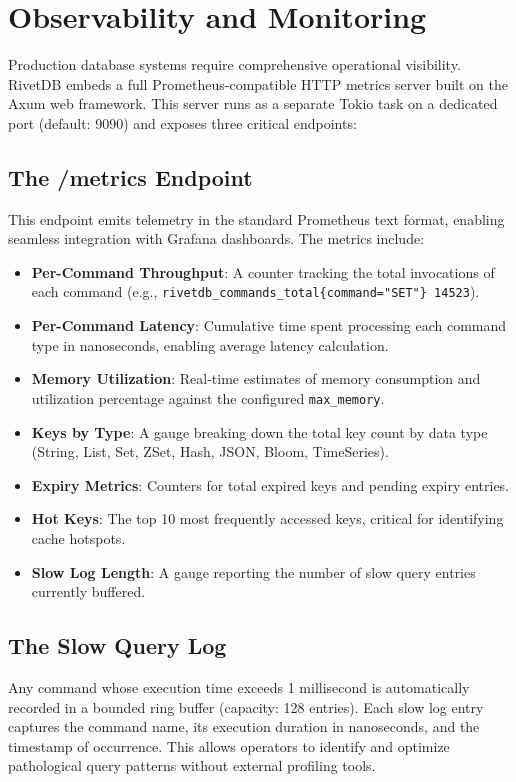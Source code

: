 \section{Observability and Monitoring}

Production database systems require comprehensive operational visibility. RivetDB embeds a full Prometheus-compatible HTTP metrics server built on the Axum web framework. This server runs as a separate Tokio task on a dedicated port (default: 9090) and exposes three critical endpoints:

\subsection{The /metrics Endpoint}
This endpoint emits telemetry in the standard Prometheus text format, enabling seamless integration with Grafana dashboards. The metrics include:

\begin{itemize}[leftmargin=2.5em]
    \item \textbf{Per-Command Throughput}: A counter tracking the total invocations of each command (e.g., \texttt{rivetdb\_commands\_total\{command="SET"\} 14523}).
    \item \textbf{Per-Command Latency}: Cumulative time spent processing each command type in nanoseconds, enabling average latency calculation.
    \item \textbf{Memory Utilization}: Real-time estimates of memory consumption and utilization percentage against the configured \texttt{max\_memory}.
    \item \textbf{Keys by Type}: A gauge breaking down the total key count by data type (String, List, Set, ZSet, Hash, JSON, Bloom, TimeSeries).
    \item \textbf{Expiry Metrics}: Counters for total expired keys and pending expiry entries.
    \item \textbf{Hot Keys}: The top 10 most frequently accessed keys, critical for identifying cache hotspots.
    \item \textbf{Slow Log Length}: A gauge reporting the number of slow query entries currently buffered.
\end{itemize}

\subsection{The Slow Query Log}
Any command whose execution time exceeds 1 millisecond is automatically recorded in a bounded ring buffer (capacity: 128 entries). Each slow log entry captures the command name, its execution duration in nanoseconds, and the timestamp of occurrence. This allows operators to identify and optimize pathological query patterns without external profiling tools.

